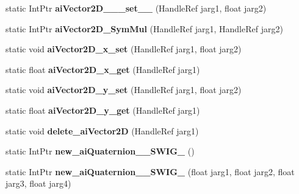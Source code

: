\begin{DoxyCompactItemize}
\item 
\hypertarget{class_assimp_p_i_n_v_o_k_e_ab03256632cc388d179e2e97df69a62b2}{static Int\+Ptr {\bfseries ai\+Vector2\+D\+\_\+\+\_\+\+\_\+set\+\_\+\+\_\+} (Handle\+Ref jarg1, float jarg2)}\label{class_assimp_p_i_n_v_o_k_e_ab03256632cc388d179e2e97df69a62b2}

\item 
\hypertarget{class_assimp_p_i_n_v_o_k_e_af40f373b8a44fb6e93aa04ab0fb16115}{static Int\+Ptr {\bfseries ai\+Vector2\+D\+\_\+\+Sym\+Mul} (Handle\+Ref jarg1, Handle\+Ref jarg2)}\label{class_assimp_p_i_n_v_o_k_e_af40f373b8a44fb6e93aa04ab0fb16115}

\item 
\hypertarget{class_assimp_p_i_n_v_o_k_e_a898b3c6311f8204a94f2e52be1a8ad3a}{static void {\bfseries ai\+Vector2\+D\+\_\+x\+\_\+set} (Handle\+Ref jarg1, float jarg2)}\label{class_assimp_p_i_n_v_o_k_e_a898b3c6311f8204a94f2e52be1a8ad3a}

\item 
\hypertarget{class_assimp_p_i_n_v_o_k_e_a2fd44219b4bb81225018e6de6ff4bc98}{static float {\bfseries ai\+Vector2\+D\+\_\+x\+\_\+get} (Handle\+Ref jarg1)}\label{class_assimp_p_i_n_v_o_k_e_a2fd44219b4bb81225018e6de6ff4bc98}

\item 
\hypertarget{class_assimp_p_i_n_v_o_k_e_a1a490ab33700ebbd86d9212c6d1e32f2}{static void {\bfseries ai\+Vector2\+D\+\_\+y\+\_\+set} (Handle\+Ref jarg1, float jarg2)}\label{class_assimp_p_i_n_v_o_k_e_a1a490ab33700ebbd86d9212c6d1e32f2}

\item 
\hypertarget{class_assimp_p_i_n_v_o_k_e_a79ba43af497c00cf6566f22167c11df7}{static float {\bfseries ai\+Vector2\+D\+\_\+y\+\_\+get} (Handle\+Ref jarg1)}\label{class_assimp_p_i_n_v_o_k_e_a79ba43af497c00cf6566f22167c11df7}

\item 
\hypertarget{class_assimp_p_i_n_v_o_k_e_aac3f57646463f2cca3dd921c99280828}{static void {\bfseries delete\+\_\+ai\+Vector2\+D} (Handle\+Ref jarg1)}\label{class_assimp_p_i_n_v_o_k_e_aac3f57646463f2cca3dd921c99280828}

\item 
\hypertarget{class_assimp_p_i_n_v_o_k_e_a3f2708470976764716f256dc45d37c1f}{static Int\+Ptr {\bfseries new\+\_\+ai\+Quaternion\+\_\+\+\_\+\+S\+W\+I\+G\+\_} ()}\label{class_assimp_p_i_n_v_o_k_e_a3f2708470976764716f256dc45d37c1f}

\item 
\hypertarget{class_assimp_p_i_n_v_o_k_e_a6c390d134567fa69e94502956fc3d7a4}{static Int\+Ptr {\bfseries new\+\_\+ai\+Quaternion\+\_\+\+\_\+\+S\+W\+I\+G\+\_} (float jarg1, float jarg2, float jarg3, float jarg4)}\label{class_assimp_p_i_n_v_o_k_e_a6c390d134567fa69e94502956fc3d7a4}


\end{DoxyCompactItemize}
